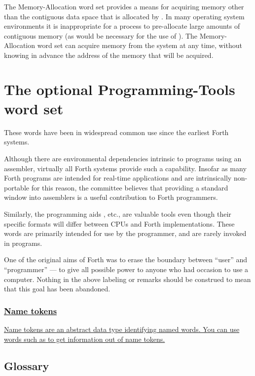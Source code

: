 The Memory-Allocation word set provides a means for acquiring memory
other than the contiguous data space that is allocated by .
In many operating system environments it is inappropriate for a process
to pre-allocate large amounts of contiguous memory (as would be
necessary for the use of ).  The Memory-Allocation word set
can acquire memory from the system at any time, without knowing in
advance the address of the memory that will be acquired.


\section{The optional Programming-Tools word set} %
\label{rat:tools}

These words have been in widespread common use since the earliest
Forth systems.

Although there are environmental dependencies intrinsic to programs
using an assembler, virtually all Forth systems provide such a
capability. Insofar as many Forth programs are intended for real-time
applications and are intrinsically non-portable for this reason, the
committee believes that providing a standard window into
assemblers is a useful contribution to Forth programmers.

Similarly, the programming aids , etc., are valuable tools
even though their specific formats will differ between CPUs and Forth
implementations. These words are primarily intended for use by the
programmer, and are rarely invoked in programs.

One of the original aims of Forth was to erase the boundary between
``user'' and ``programmer'' --- to give all possible power to anyone
who had occasion to use a computer. Nothing in the above labeling or
remarks should be construed to mean that this goal has been abandoned.

\cbstart{}
\setcounter{subsection}{3}
\subsubsection[Name tokens]{\uline{Name tokens}}
\label{rat:tools:nt}

\uline{%
Name tokens are an abstract data type identifying named words.
You can use words such as  to get information
out of name tokens.}
\cbend

\setcounter{subsection}{5}
\subsection{Glossary} %

